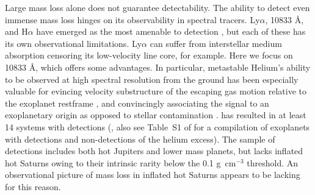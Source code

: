 \documentclass[twocolumn]{aastex631}
\begin{document}
Large mass loss alone does not guarantee detectability.  The ability to detect even immense mass loss hinges on its observability in spectral tracers.  Ly$\alpha$,  10833 \AA, and H$\alpha$ have emerged as the most amenable to detection \citep{2000ApJ...537..916S,2003Natur.422..143V,2012ApJ...751...86J,2018NatAs...2..714Y,2018ApJ...855L..11O,2018Natur.557...68S, 2022arXiv221116243D,2023MNRAS.518.4357O}, but each of these has its own observational limitations.  Ly$\alpha$ can suffer from interstellar medium  absorption censoring its low-velocity line core, for example.  Here we focus on  10833 \AA, which offers some advantages.  In particular, metastable Helium's ability to be observed at high spectral resolution from the ground has been especially valuable for evincing velocity substructure of the escaping gas motion relative to the exoplanet restframe \citep{2019A&A...629A.110A,2020ApJ...894...97N}, and convincingly associating the signal to an exoplanetary origin as opposed to stellar contamination \citep{2018AJ....156..189C}.   has resulted in at least 14 systems with detections (\citet{2022arXiv221116243D}, also see Table~S1 of \citealt{doi:10.1126/sciadv.adf8736} for a compilation of exoplanets with detections and non-detections of the helium excess).  The sample of detections includes both hot Jupiters and lower mass planets, but lacks inflated hot Saturns owing to their intrinsic rarity below the 0.1 g~cm$^{-3}$ threshold. An observational picture of mass loss in inflated hot Saturns appears to be lacking for this reason.
\end{document}

